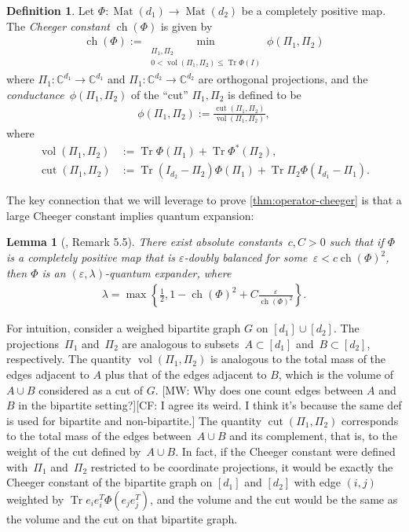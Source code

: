 \documentclass[aos]{imsart}
\newtheorem{lemma}[theorem]{Lemma}
\theoremstyle{definition}
\newtheorem*{definition}{Definition}
\numberwithin{equation}{section}
\DeclareMathOperator{\vol}{vol}
\DeclareMathOperator{\cut}{cut}
\DeclareMathOperator{\ch}{ch}
\DeclareMathOperator{\Mat}{Mat}
\DeclareMathOperator{\tr}{Tr}
\newcommand{\C}{{\mathbb{C}}}
\newcommand{\eps}{\varepsilon}
\newcommand{\CF}[1]{{\color{purple}[CF: #1]}}
\newcommand{\MW}[1]{{\color{red}[MW: #1]}}
\newcommand{\CF}[1]{{}}
\newcommand{\MW}[1]{{}}
\begin{document}
\begin{appendix}
\begin{definition}\label{def:cheeger}
Let $\Phi \colon \Mat(d_1) \to \Mat(d_2)$ be a completely positive map.
The \emph{Cheeger constant} $\ch(\Phi)$ is given by
\begin{align*}
  \ch(\Phi) := \min_{\substack{\Pi_1, \Pi_2 \\ 0 < \vol(\Pi_1, \Pi_2) \leq \tr \Phi(I)}} \phi(\Pi_1,\Pi_2)
\end{align*}
where $\Pi_1\colon \C^{d_1} \to \C^{d_1}$ and $\Pi_1\colon \C^{d_2} \to \C^{d_2}$ are orthogonal projections, and the \emph{conductance}~$\phi(\Pi_1, \Pi_2)$ of the ``cut'' $\Pi_1, \Pi_2$ is defined to be
\begin{align*}
  \phi(\Pi_1,\Pi_2) := \frac{\cut(\Pi_1, \Pi_2)}{\vol(\Pi_1,\Pi_2)},
\end{align*}
where
\begin{align*}
  \vol(\Pi_1,\Pi_2) &:= \tr \Phi(\Pi_1) + \tr \Phi^*(\Pi_2), \\
  \cut(\Pi_1, \Pi_2) &:= \tr (I_{d_2} - \Pi_2) \Phi(\Pi_1) + \tr \Pi_2 \Phi(I_{d_1} - \Pi_1).
\end{align*}
\end{definition}

The key connection that we will leverage to prove \cref{thm:operator-cheeger} is that a large Cheeger constant implies quantum expansion:

\begin{lemma} [\cite{FM20}, Remark 5.5]\label{lem:op-cheeger}
There exist absolute constants~$c, C>0$ such that if $\Phi$ is a completely positive map that is $\eps$-doubly balanced for some~$\eps < c \ch(\Phi)^2$, then $\Phi$ is an $(\eps,\lambda)$-quantum expander, where
\begin{align*}
  \lambda = \max\left\{ \frac12, 1 -  \ch(\Phi)^2 + C \frac{\eps}{\ch(\Phi)^2} \right\}.
\end{align*}
\end{lemma}

For intuition, consider a weighed bipartite graph $G$ on $[d_1] \cup [d_2]$.
The projections~$\Pi_1$ and~$\Pi_2$ are analogous to subsets~$A \subset[d_1]$ and~$B \subset [d_2]$, respectively.
The quantity $\vol(\Pi_1, \Pi_2)$ is analogous to the total mass of the edges adjacent to $A$ plus that of the edges adjacent to $B$, which is the volume of $A \cup B$ considered as a cut of $G$.
\MW{Why does one count edges between $A$ and $B$ in the bipartite setting?}\CF{I agree its weird. I think it's because the same def is used for bipartite and non-bipartite.}
The quantity $\cut(\Pi_1, \Pi_2)$ corresponds to the total mass of the edges between~$A \cup B$ and its complement, that is, to the weight of the cut defined by~$A \cup B$.
In fact, if the Cheeger constant were defined with~$\Pi_1$ and~$\Pi_2$ restricted to be coordinate projections, it would be exactly the Cheeger constant of the bipartite graph on $[d_1]$ and $[d_2]$ with edge $(i,j)$ weighted by $\tr e_i e_i^T \Phi(e_j e_j^T)$, and the volume and the cut would be the same as the volume and the cut on that bipartite graph.


\end{appendix}
\end{document}
